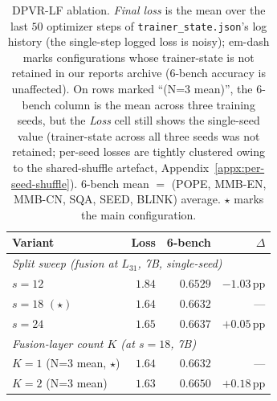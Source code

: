 \documentclass[a4paper,fleqn,review]{cas-sc}
\newcommand{\tbd}[0]{\textcolor{red}{[TBD]}}
\newcommand{\dpvrlf}{DPVR-LF}
\begin{document}
\begin{table}[t]
\centering
\caption{\dpvrlf{} ablation. \emph{Final loss} is the mean over the
last $50$ optimizer steps of \texttt{trainer\_state.json}'s log
history (the single-step logged loss is noisy); em-dash marks
configurations whose trainer-state is not retained in our reports
archive (6-bench accuracy is unaffected). On rows marked
``(N=3 mean)'', the 6-bench column is the mean across three
training seeds, but the \emph{Loss} cell still shows the
single-seed value (trainer-state across all three seeds was not
retained; per-seed losses are tightly clustered owing to the
shared-shuffle artefact, Appendix~\ref{appx:per-seed-shuffle}).
6-bench mean $=$ (POPE, MMB-EN, MMB-CN, SQA, SEED, BLINK) average.
$\star$ marks the main configuration.}
\label{tab:x3-ablation}
\footnotesize
\setlength{\tabcolsep}{4pt}
\begin{tabular}{lrrr}
\toprule
Variant & Loss & 6-bench & $\Delta$ \\
\midrule
\multicolumn{4}{l}{\emph{Split sweep (fusion at $L_{31}$, 7B, single-seed)}} \\
$s = 12$                    & $1.84$         & $0.6529$         & $-1.03$\,pp \\
\rowcolor[RGB]{236,244,252}
$s = 18$ $(\star)$             & \textbf{$1.64$} & \textbf{$0.6632$} & ---         \\
$s = 24$                    & $1.65$         & $0.6637$         & $+0.05$\,pp \\
\midrule
\multicolumn{4}{l}{\emph{Fusion-layer count $K$ (at $s = 18$, 7B)}} \\
\rowcolor[RGB]{236,244,252}
$K = 1$ (N=3 mean, $\star$)   & \textbf{$1.64$} & \textbf{$0.6632$} & ---         \\
$K = 2$ (N=3 mean)          & $1.63$         & $0.6650$         & $+0.18$\,pp \\

\end{tabular}
\end{table}
\end{document}
